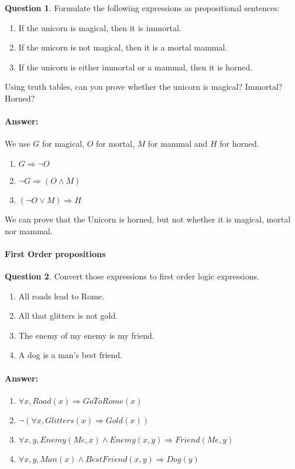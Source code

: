 \documentclass[11pt,a4paper]{article}
\theoremstyle{definition}%
\newtheorem{Q}{Question}[] %
\newcommand{\reponse}[1]{%
\ifthenelse {\boolean{corrige}} {\paragraph{Answer:} \color{darkblue}   #1\color{black}} {}
}
\begin{document}
\begin{Q}
Formulate the following expressions as propositional sentences:
\begin{enumerate}
    \item If the unicorn is magical, then it is immortal.
    \item If the unicorn is not magical, then it is a mortal mammal.
    \item If the unicorn is either immortal or a mammal, then it is horned.
\end{enumerate}
Using truth tables, can you prove whether the unicorn is magical? Immortal? Horned?

\reponse{
    We use $G$ for magical, $O$ for mortal, $M$ for mammal and $H$ for horned.
\begin{enumerate}
    \item $G \Rightarrow \neg O$ 
    \item $\neg G \Rightarrow (O \wedge M) $
    \item $(\neg O \vee M) \Rightarrow H $
\end{enumerate}

We can prove that the Unicorn is horned, but not whether it is magical, mortal nor mammal.
}
\end{Q}

\paragraph{First Order propositions}
\begin{Q}
Convert those expressions to first order logic expressions.
\begin{enumerate}
    \item All roads lead to Rome.
    \item All that glitters is not gold.
    \item The enemy of my enemy is my friend.
    \item A dog is a man's best friend.
\end{enumerate}

\reponse{
\begin{enumerate}
    \item $\forall x, Road(x) \Rightarrow GoToRome(x)$ 
    \item $\neg (\forall x, Glitters(x) \Rightarrow Gold(x) ) $
    \item $\forall x,y, Enemy(Me,x) \wedge Enemy(x,y) \Rightarrow Friend(Me,y) $
    \item $\forall x,y, Man(x) \wedge BestFriend(x,y) \Rightarrow Dog(y)$
\end{enumerate}


}
\end{Q}
\end{document}
